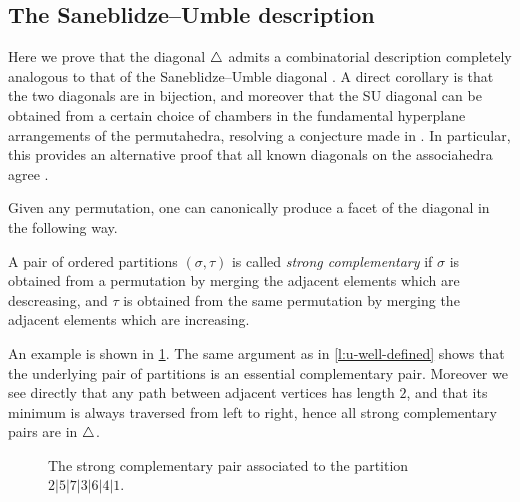 
\subsection{The Saneblidze--Umble description}

Here we prove that the diagonal $\triangle$ admits a combinatorial description completely analogous to that of the Saneblidze--Umble diagonal \cite{SaneblidzeUmble04}. 
A direct corollary is that the two diagonals are in bijection, and moreover that the SU diagonal can be obtained from a certain choice of chambers in the fundamental hyperplane arrangements of the permutahedra, resolving a conjecture made in \cite{LA21}.
In particular, this provides an alternative proof that all known diagonals on the associahedra agree \cite{saneblidzeComparingDiagonalsAssociahedra2022}.

Given any permutation, one can canonically produce a facet of the diagonal in the following way. 

\begin{definition}
    A pair of ordered partitions $(\sigma,\tau)$ is called \emph{strong complementary} if $\sigma$ is obtained from a permutation by merging the adjacent elements which are descreasing, and $\tau$ is obtained from the same permutation by merging the adjacent elements which are increasing.
\end{definition}

An example is shown in \cref{fig:strong-complementary}.
The same argument as in \cref{l:u-well-defined} shows that the underlying pair of partitions is an essential complementary pair. 
Moreover we see directly that any path between adjacent vertices has length $2$, and that its minimum is always traversed from left to right, hence all strong complementary pairs are in $\triangle$. 

\begin{figure}[h!]
\caption{The strong complementary pair associated to the partition $2|5|7|3|6|4|1$.}
\label{fig:strong-complementary}
\end{figure}

